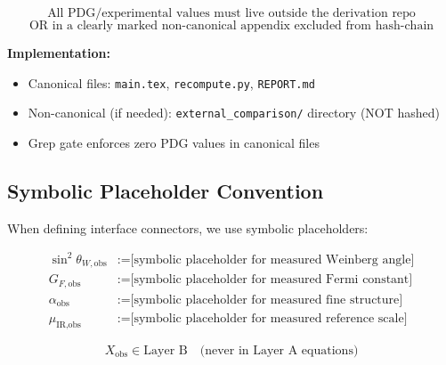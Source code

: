 \documentclass[11pt,a4paper]{article}
\theoremstyle{definition}
\begin{document}
\begin{firewallbox}
\begin{equation}
\label{eq:quarantine_rule}
\boxed{\text{All PDG/experimental values must live outside the derivation repo}}
\end{equation}
\begin{equation}
\label{eq:quarantine_rule_2}
\boxed{\text{OR in a clearly marked non-canonical appendix excluded from hash-chain}}
\end{equation}

\textbf{Implementation:}
\begin{itemize}
\item Canonical files: \texttt{main.tex}, \texttt{recompute.py}, \texttt{REPORT.md}
\item Non-canonical (if needed): \texttt{external\_comparison/} directory (NOT hashed)
\item Grep gate enforces zero PDG values in canonical files
\end{itemize}
\end{firewallbox}

\subsection{Symbolic Placeholder Convention}
\label{subsec:placeholders}

When defining interface connectors, we use symbolic placeholders:

\begin{align}
\label{eq:placeholder_sw2}
\sin^2\theta_{W,\text{obs}} &:= \text{[symbolic placeholder for measured Weinberg angle]} \\
\label{eq:placeholder_GF}
G_{F,\text{obs}} &:= \text{[symbolic placeholder for measured Fermi constant]} \\
\label{eq:placeholder_alpha}
\alpha_{\text{obs}} &:= \text{[symbolic placeholder for measured fine structure]} \\
\label{eq:placeholder_mu}
\mu_{\text{IR,obs}} &:= \text{[symbolic placeholder for measured reference scale]}
\end{align}

\begin{equation}
\label{eq:placeholder_convention}
X_{\text{obs}} \in \text{Layer B} \quad \text{(never in Layer A equations)}
\end{equation}
\end{document}
